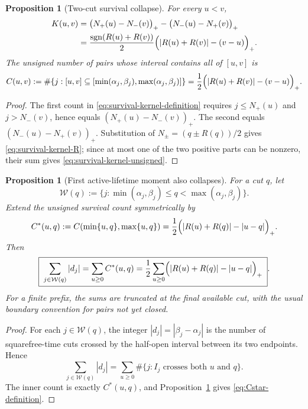 \documentclass[11pt]{amsart}
\numberwithin{equation}{section}
\theoremstyle{plain}
\newtheorem{proposition}[theorem]{Proposition}
\theoremstyle{definition}
\theoremstyle{remark}
\begin{document}
\begin{proposition}[Two-cut survival collapse]
\label{prop:survival-kernel-collapse}
For every $u<v$,
\begin{align}
K(u,v)
&=\bigl(N_+(u)-N_-(v)\bigr)_+
 -\bigl(N_-(u)-N_+(v)\bigr)_+
\label{eq:survival-kernel-counters}\\
&=\frac{\operatorname{sgn}(R(u)+R(v))}{2}
\Bigl(|R(u)+R(v)|-(v-u)\Bigr)_+.
\label{eq:survival-kernel-R}
\end{align}
The unsigned number of pairs whose interval contains all of $[u,v]$ is
\begin{equation}
\label{eq:survival-kernel-unsigned}
C(u,v):=\#\{j:[u,v]\subseteq
[\min(\alpha_j,\beta_j),\max(\alpha_j,\beta_j)]\}
=\frac12\Bigl(|R(u)+R(v)|-(v-u)\Bigr)_+.
\end{equation}
\end{proposition}

\begin{proof}
The first count in \eqref{eq:survival-kernel-definition} requires
$j\le N_+(u)$ and $j>N_-(v)$, hence equals
$(N_+(u)-N_-(v))_+$.  The second equals
$(N_-(u)-N_+(v))_+$.  Substitution of
$N_\pm=(q\pm R(q))/2$ gives \eqref{eq:survival-kernel-R}; since at most one
of the two positive parts can be nonzero, their sum gives
\eqref{eq:survival-kernel-unsigned}.
\end{proof}

\begin{proposition}[First active-lifetime moment also collapses]
\label{prop:active-lifetime-first-moment}
For a cut $q$, let
\begin{equation}
\label{eq:active-cut-set}
\mathcal W(q):=\{j:\min(\alpha_j,\beta_j)\le q<\max(\alpha_j,\beta_j)\}.
\end{equation}
Extend the unsigned survival count symmetrically by
\begin{equation}
\label{eq:Cstar-definition}
C^*(u,q):=C(\min\{u,q\},\max\{u,q\})
=\frac12\Bigl(|R(u)+R(q)|-|u-q|\Bigr)_+.
\end{equation}
Then
\begin{equation}
\label{eq:active-first-moment-collapse}
\boxed{\;
\sum_{j\in\mathcal W(q)}|d_j|
=\sum_{u\ge0} C^*(u,q)
=\frac12\sum_{u\ge0}
\Bigl(|R(u)+R(q)|-|u-q|\Bigr)_+
\;}.
\end{equation}
For a finite prefix, the sums are truncated at the final available cut, with the
usual boundary convention for pairs not yet closed.
\end{proposition}

\begin{proof}
For each $j\in\mathcal W(q)$, the integer $|d_j|=|\beta_j-\alpha_j|$ is the
number of squarefree-time cuts crossed by the half-open interval between its two
endpoints.  Hence
\begin{equation}
\label{eq:active-first-moment-double-count}
\sum_{j\in\mathcal W(q)}|d_j|
=\sum_{u\ge0}\#\{j:\text{$I_j$ crosses both $u$ and $q$}\}.
\end{equation}
The inner count is exactly $C^*(u,q)$, and
Proposition~\ref{prop:survival-kernel-collapse} gives
\eqref{eq:Cstar-definition}.
\end{proof}
\end{document}
